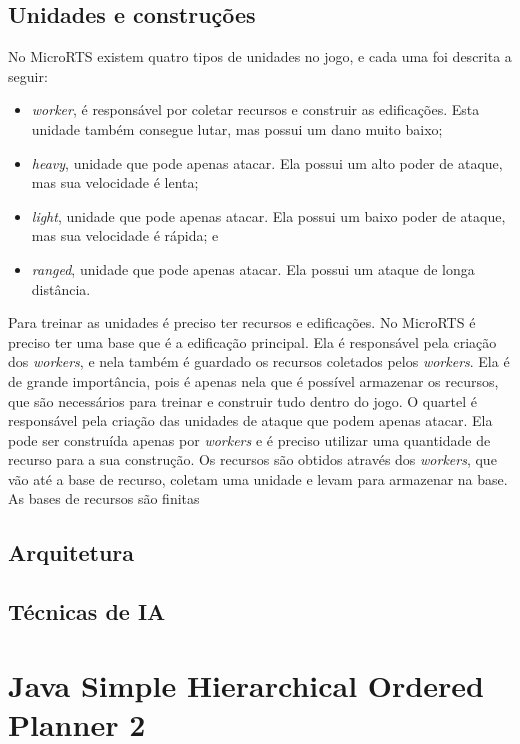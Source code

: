 \subsection{Unidades e construções}
No MicroRTS existem quatro tipos de unidades no jogo, e cada uma foi descrita a seguir:

\begin{itemize}
	\item \textit{worker}, é responsável por coletar recursos e construir as edificações. Esta unidade também consegue lutar, mas possui um dano muito baixo;
	\item \textit{heavy}, unidade que pode apenas atacar. Ela possui um alto poder de ataque, mas sua velocidade é lenta;
	\item \textit{light}, unidade que pode apenas atacar. Ela possui um baixo poder de ataque, mas sua velocidade é rápida; e
	\item \textit{ranged}, unidade que pode apenas atacar. Ela possui um ataque de longa distância. 
\end{itemize} 

Para treinar as unidades é preciso ter recursos e edificações. No MicroRTS é preciso ter uma base que é a edificação principal. Ela é responsável pela criação dos \textit{workers}, e nela também é guardado os recursos coletados pelos \textit{workers}. Ela é de grande importância, pois é apenas nela que é possível armazenar os recursos, que são necessários para treinar e construir tudo dentro do jogo. O quartel é responsável pela criação das unidades de ataque que podem apenas atacar. Ela pode ser construída apenas por \textit{workers} e é preciso utilizar uma quantidade de recurso para a sua construção. Os recursos são obtidos através dos \textit{workers}, que vão até a base de recurso, coletam uma unidade e levam para armazenar na base. As bases de recursos são finitas

\subsection{Arquitetura}

\subsection{Técnicas de IA}


\section{Java Simple Hierarchical Ordered Planner 2}
		
